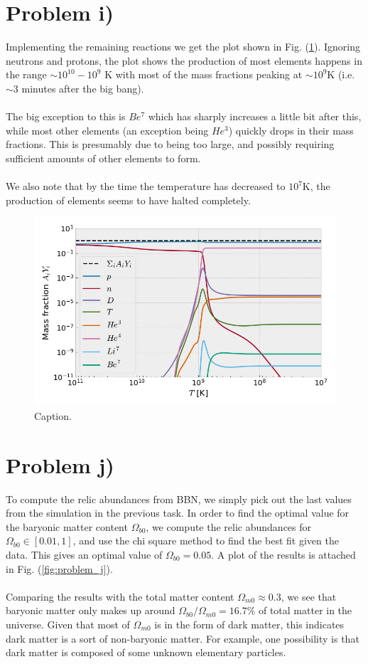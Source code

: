 \documentclass[reprint,english,notitlepage]{revtex4-1}  %
\numberwithin{equation}{section}
\begin{document}
\section{Problem i)} \label{ref:task_i)}
Implementing the remaining reactions we get the plot shown in Fig.
(\ref{fig:problem_i}). Ignoring neutrons and protons, the plot shows the
production of most elements happens in the range $\sim 10^{10} - 10^9$ K with
most of the mass fractions peaking at $\sim 10^{9}$K (i.e. $\sim 3$ minutes
after the big bang).
\\ \\
The big exception to this is $Be^7$ which has sharply increases a little bit after
this, while most other elements (an exception being $He^3$) quickly drops in their
mass fractions. This is presumably due to being too large, and possibly requiring
sufficient amounts of other elements to form.
\\ \\
We also note that by the time the temperature has decreased to $10^7$K, the
production of elements seems to have halted completely.
\begin{figure}[h]
	\includegraphics[width=\columnwidth]{densities_i.png}
	\caption{Caption.}
	\label{fig:problem_i}
\end{figure}

\section{Problem j)}
To compute the relic abundances from BBN, we simply pick out the last values
from the simulation in the previous task. In order to find the optimal value for
the baryonic matter content $\Omega_{b0}$, we compute the relic abundances for
$\Omega_{b0}\in[0.01,1]$, and use the chi square method to find the best
fit given the data. This gives an optimal value of $\Omega_{b0}=0.05$. A plot
of the results is attached in Fig. (\ref{fig:problem_j}).
\\ \\
Comparing the results with the total matter content $\Omega_{m0}\approx0.3$,
we see that baryonic matter only makes up around $\Omega_{b0}/\Omega_{m0} = 16.7\%$
of total matter in the universe. Given that most of $\Omega_{m0}$ is in the form
of dark matter, this indicates dark matter is a sort of non-baryonic matter.
For example, one possibility is that dark matter is composed of some unknown
elementary particles.
\end{document}
